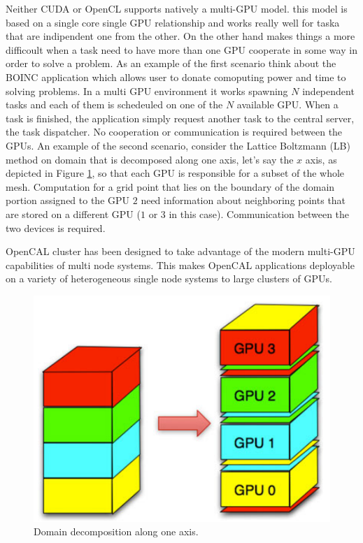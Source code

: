 Neither CUDA or OpenCL supports natively a multi-GPU model. this model is based on a single core single GPU relationship and works really well for taska that are indipendent one from the other. On the other hand makes things a more difficoult when a task need to have more than one GPU cooperate in some way in order to solve a problem.
As an example of the first scenario think about the BOINC application \cite{Anderson:2004} which allows user to donate comoputing power and time to solving problems. In a multi GPU environment it works spawning $N$ independent tasks and each of them is schedeuled on one of the $N$ available GPU. When a task is finished, the application simply request another task to the central server, the task dispatcher. No cooperation or communication is required between the GPUs.
An example of the second scenario, consider the Lattice Boltzmann (LB) \cite{McNamara&Zanetti-1988} \cite{Aidun2010439} \cite{Higuera&Jimenez-1989} method on domain that is decomposed along one axis, let's say the $x$ axis, as depicted in Figure \ref{fig:multigpu_domain_decomposition}, so that each GPU is responsible for a subset of the whole mesh. Computation for a grid point that lies on the boundary of the domain portion assigned to the GPU $2$ need information about neighboring points that are stored on a different GPU ($1$ or $3$ in this case). Communication between the two devices is required.

OpenCAL cluster has been designed to take advantage of the modern multi-GPU capabilities of multi node systems. This makes OpenCAL applications deployable on a variety of heterogeneous single node systems to large clusters of GPUs.

  \begin{figure}
	\begin{center}
		\includegraphics[width=1.0\textwidth]{./images/opencal/multigpu_domain_decomposition.png}
		\caption{Domain decomposition along one axis.}
		\label{fig:multigpu_domain_decomposition}
	\end{center}
\end{figure}

